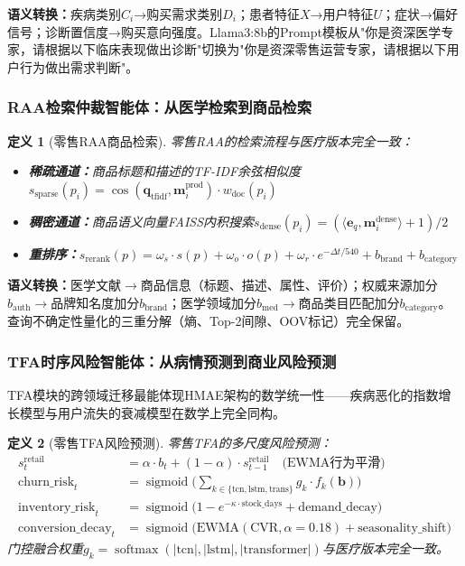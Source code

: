 \documentclass[11pt,a4paper]{ctexart}
\newtheorem{definition}{定义}[section]
\theoremstyle{remark}
\DeclareMathOperator{\softmax}{softmax}
\DeclareMathOperator{\sigmoid}{sigmoid}
\begin{document}
\textbf{语义转换：}疾病类别$C_i$→购买需求类别$D_i$；患者特征$X$→用户特征$U$；症状→偏好信号；诊断置信度→购买意向强度。Llama3:8b的Prompt模板从"你是资深医学专家，请根据以下临床表现做出诊断"切换为"你是资深零售运营专家，请根据以下用户行为做出需求判断"。

\subsubsection{RAA检索仲裁智能体：从医学检索到商品检索}

\begin{definition}[零售RAA商品检索]
零售RAA的检索流程与医疗版本完全一致：
\begin{itemize}[nosep]
\item \textbf{稀疏通道：}商品标题和描述的TF-IDF余弦相似度$s_{\text{sparse}}(p_i) = \cos(\mathbf{q}_{\text{tfidf}}, \mathbf{m}_i^{\text{prod}}) \cdot w_{\text{doc}}(p_i)$
\item \textbf{稠密通道：}商品语义向量FAISS内积搜索$s_{\text{dense}}(p_i) = (\langle \mathbf{e}_q, \mathbf{m}_i^{\text{dense}} \rangle + 1) / 2$
\item \textbf{重排序：}$s_{\text{rerank}}(p) = \omega_s \cdot s(p) + \omega_o \cdot o(p) + \omega_r \cdot e^{-\Delta t / 540} + b_{\text{brand}} + b_{\text{category}}$
\end{itemize}
\end{definition}

\textbf{语义转换：}医学文献$\rightarrow$商品信息（标题、描述、属性、评价）；权威来源加分$b_{\text{auth}} \rightarrow$品牌知名度加分$b_{\text{brand}}$；医学领域加分$b_{\text{med}} \rightarrow$商品类目匹配加分$b_{\text{category}}$。查询不确定性量化的三重分解（熵、Top-2间隙、OOV标记）完全保留。

\subsubsection{TFA时序风险智能体：从病情预测到商业风险预测}

TFA模块的跨领域迁移最能体现HMAE架构的数学统一性——疾病恶化的指数增长模型与用户流失的衰减模型在数学上完全同构。

\begin{definition}[零售TFA风险预测]
零售TFA的多尺度风险预测：
\begin{align}
s_t^{\text{retail}} &= \alpha \cdot b_t + (1-\alpha) \cdot s_{t-1}^{\text{retail}} \quad \text{(EWMA行为平滑)} \\
\text{churn\_risk}_t &= \sigmoid\Big(\sum_{k \in \{\text{tcn},\text{lstm},\text{trans}\}} g_k \cdot f_k(\mathbf{b})\Big) \\
\text{inventory\_risk}_t &= \sigmoid\Big(1 - e^{-\kappa \cdot \text{stock\_days}} + \text{demand\_decay}\Big) \\
\text{conversion\_decay}_t &= \sigmoid\Big(\text{EWMA}(\text{CVR}, \alpha=0.18) + \text{seasonality\_shift}\Big)
\end{align}
门控融合权重$g_k = \softmax(|\text{tcn}|, |\text{lstm}|, |\text{transformer}|)$与医疗版本完全一致。
\end{definition}
\end{document}
